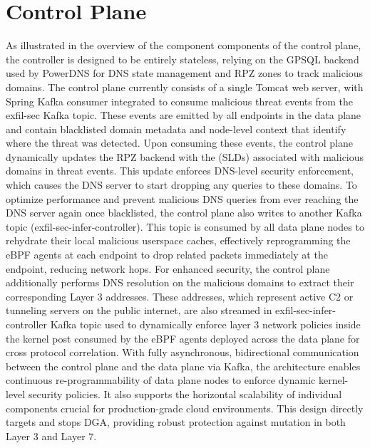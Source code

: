 \documentclass [11pt, proquest] {uwthesis}[2020/02/24]
\begin{document}
\section{Control Plane}
As illustrated in the overview of the component components of the control plane, the controller is designed to be entirely stateless, relying on the GPSQL backend used by PowerDNS for DNS state management and RPZ zones to track malicious domains. The control plane currently consists of a single Tomcat web server, with Spring Kafka consumer integrated to consume malicious threat events from the exfil-sec Kafka topic. These events are emitted by all endpoints in the data plane and contain blacklisted domain metadata and node-level context that identify where the threat was detected. Upon consuming these events, the control plane dynamically updates the RPZ backend with the (SLDs) associated with malicious domains in threat events. This update enforces DNS-level security enforcement, which causes the DNS server to start dropping any queries to these domains. To optimize performance and prevent malicious DNS queries from ever reaching the DNS server again once blacklisted, the control plane also writes to another Kafka topic (exfil-sec-infer-controller). This topic is consumed by all data plane nodes to rehydrate their local malicious userspace caches, effectively reprogramming the eBPF agents at each endpoint to drop related packets immediately at the endpoint, reducing network hops. For enhanced security, the control plane additionally performs DNS resolution on the malicious domains to extract their corresponding Layer 3 addresses. These addresses, which  represent active C2 or tunneling servers on the public internet, are also streamed in exfil-sec-infer-controller Kafka topic used to dynamically enforce layer 3 network policies inside the kernel post consumed by the eBPF agents deployed across the data plane for cross protocol correlation. With fully asynchronous, bidirectional communication between the control plane and the data plane via Kafka, the architecture enables continuous re-programmability of data plane nodes to enforce dynamic kernel-level security policies. It also supports the horizontal scalability of individual components crucial for production-grade cloud environments. This design directly targets and stops DGA, providing robust protection against mutation in both Layer 3 and Layer 7.
\end{document}
